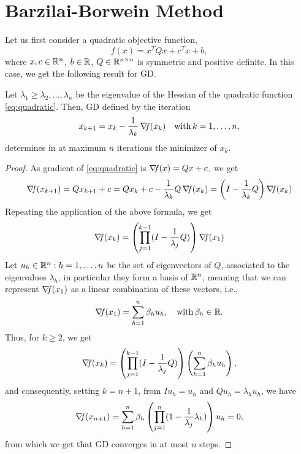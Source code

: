 \documentclass[10pt,a4paper]{article}
\begin{document}
\section{Barzilai-Borwein Method}
Let us first consider a quadratic objective function, 
\begin{equation}\label{eq:quadratic}
	f(x) = x^TQx + c^Tx + b,
\end{equation}
where $x,c\in\mathbb{R}^n$, $b\in \mathbb{R}$, $Q\in \mathbb{R}^{n\times n}$ is symmetric and positive definite. In this case, we get the following result for GD.
\begin{proposition}
	Let $\lambda_1\geq \lambda_2, \dots,\lambda_n$ be the eigenvalue of the Hessian of the quadratic function \eqref{eq:quadratic}. Then, GD defined by the iteration
	\begin{equation}\label{eq:eigengrad}
		x_{k+1} = x_k -\frac{1}{\lambda_k} \operatorname*{\mathit{\nabla \!f}}(x_k) \quad \mathord{\mathrm{with }}\, k=1, \dots, n,
	\end{equation}
	determines in at maximum $n$ iterations the minimizer of $x_k$. 
\end{proposition}
\begin{proof}
	As gradient of \eqref{eq:quadratic} is $\operatorname*{\mathit{\nabla \!f}}(x)=Qx+c$, we get
	\begin{equation*}
		\operatorname*{\mathit{\nabla \!f}}(x_{k+1}) = Qx_{k+1} +c = Qx_k +c -\frac{1}{\lambda_k} Q \operatorname*{\mathit{\nabla \!f}}(x_k) = \left(I -\frac{1}{\lambda_k}Q\right)\operatorname*{\mathit{\nabla \!f}}(x_k)
	\end{equation*}
Repeating the application of the above formula, we get 
\begin{equation*}
	\operatorname*{\mathit{\nabla \!f}}(x_k) = \left(\prod_{j=1}^{k-1}(I-\frac{1}{\lambda_j}Q)\right)\operatorname*{\mathit{\nabla \!f}}(x_1)
\end{equation*}
Let ${u_h \in \mathbb{R}^n: h=1, \dots, n}$ be the set of eigenvectors of $Q$, associated to the eigenvalues $\lambda_h$, in particular they form a basis of $\mathbb{R}^n$, meaning that we can represent $\operatorname*{\mathit{\nabla \!f}}(x_1)$ as a linear combination of these vectors, i.e.,  
\begin{equation*}
	\operatorname*{\mathit{\nabla \!f}}(x_1) = \sum_{h=1}^{n} \beta_h u_h,\quad\mathord{\mathrm{with }}\, \beta_h\in\mathbb{R}. 
\end{equation*}
Thus, for $k\geq 2$, we get 
\begin{equation*}
	\operatorname*{\mathit{\nabla \!f}}(x_k) = \left(\prod_{j=1}^{k-1}(I-\frac{1}{\lambda_j}Q)\right) \left(\sum_{h=1}^{n} \beta_h u_h\right),
\end{equation*}
and consequently, setting $k=n+1$, from $Iu_h = u_h$ and $Qu_h=\lambda_hu_h$, we have
\begin{equation*}
	\operatorname*{\mathit{\nabla \!f}}(x_{n+1}) = \sum_{h=1}^{n} \beta_h \left(\prod_{j=1}^{n}(1-\frac{1}{\lambda_j}\lambda_h)\right) u_h=0,
\end{equation*}
from which we get that GD converges in at most $n$ steps.
\end{proof}
\end{document}
